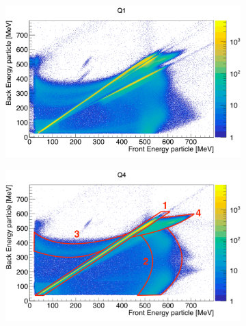 \documentclass[twoside,english]{uiofysmaster/uiofysmaster}
\begin{document}
\begin{figure}[htb!]
	\centering
	\begin{subfigure}[t]{0.49\textwidth}
		\centering
		\includegraphics[width=\textwidth]{../Plots/plotting/E_f_b_Q1-online.png}
		\caption{}
		\label{fig:CD_cal_online}
	\end{subfigure}
	\hfill
	\begin{subfigure}[t]{0.49\textwidth}
		\centering
		\includegraphics[width=\textwidth]{../Plots/plotting/E_f_b_Q4-user-drawing.png}
		\caption{}
		\label{fig:EFBQ4}
	\end{subfigure}
	\begin{subfigure}[t]{0.49\textwidth}
		\centering

\end{subfigure}
\end{figure}
\end{document}
